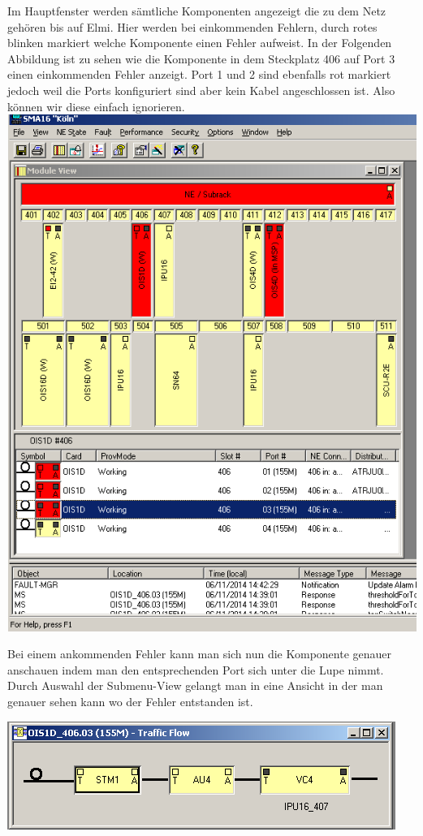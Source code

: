 Im Hauptfenster werden sämtliche Komponenten angezeigt die zu dem Netz gehören bis auf Elmi. Hier werden bei einkommenden Fehlern, durch rotes blinken markiert welche Komponente einen Fehler aufweist. In der Folgenden Abbildung ist zu sehen wie die Komponente in dem Steckplatz 406 auf Port 3 einen einkommenden Fehler anzeigt. Port 1 und 2 sind ebenfalls rot markiert jedoch weil die Ports konfiguriert sind aber kein Kabel angeschlossen ist. Also können wir diese einfach ignorieren. 
\includegraphics[scale=1]{sdh/Fehler2.bmp} 

Bei einem ankommenden Fehler kann man sich nun die Komponente genauer anschauen indem man den entsprechenden Port sich unter die Lupe nimmt. Durch Auswahl der Submenu-View gelangt man in eine Ansicht in der man genauer sehen kann wo der Fehler entstanden ist. 

\includegraphics[scale=1]{sdh/komponent-performance.bmp} 

